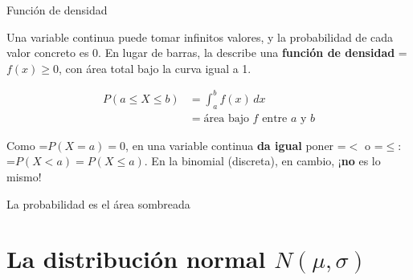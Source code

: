 \documentclass[11pt,a4paper]{article}
\newcommand{\lt}{<}\newcommand{\gt}{>}
\newcommand{\fmm}[1]{\setbox0=\hbox{$#1$}\ifdim\wd0>\linewidth\[#1\]\else\mbox{\box0}\fi}
\begin{document}
  

  
\begin{fmdef}{Función de densidad}
\par\noindent \begin{minipage}[t]{0.48\linewidth}\vspace{0pt}\raggedright Una variable continua puede tomar infinitos valores, y la probabilidad de cada valor concreto es 0. En lugar de barras, la describe una \textbf{función de densidad} \fmm{f(x)\geq0}, con área total bajo la curva igual a 1.

          
\[\begin{aligned}P(a\leq X\leq b)&=\int_a^b f(x)\,dx\\&=\text{área bajo }f\text{ entre }a\text{ y }b\end{aligned}\]

          
\begin{fmnote}Como \fmm{P(X=a)=0}, en una variable continua \textbf{da igual} poner \fmm{\lt} o \fmm{\leq}: \fmm{P(X\lt a)=P(X\leq a)}. En la binomial (discreta), en cambio, ¡\textbf{no} es lo mismo!\end{fmnote}\end{minipage}\hfill\begin{minipage}[t]{0.48\linewidth}\vspace{0pt}\raggedright {\centering {}\par}{\centering\footnotesize La probabilidad es el área sombreada\par}\end{minipage}\par\medskip
\end{fmdef}

\section{La distribución normal $N(\mu,\sigma)$}\hypertarget{sec5}{}
\end{document}
